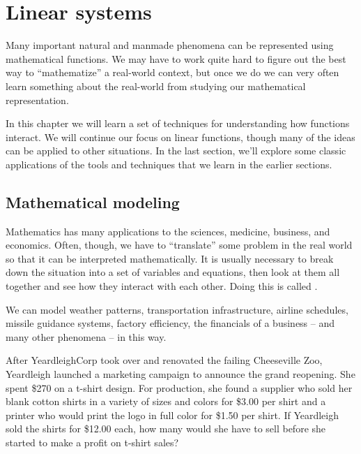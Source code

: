 \chapter{Linear systems}
\label{ch:systems}


Many important natural and manmade phenomena can be represented using mathematical functions. We may have to work quite hard to figure out the best way to ``mathematize'' a real-world context, but once we do we can very often learn something about the real-world from studying our mathematical representation.

In this chapter we will learn a set of techniques for understanding how functions interact. We will continue our focus on linear functions, though many of the ideas can be applied to other situations. In the last section, we'll explore some classic applications of the tools and techniques that we learn in the earlier sections.

\section{Mathematical modeling}
\label{sec:sysintro}

Mathematics has many applications to the sciences, medicine, business, and economics. Often, though, we have to ``translate'' some problem in the real world so that it can be interpreted mathematically. It is usually necessary to break down the situation into a set of variables and equations, then look at them all together and see how they interact with each other. Doing this is called .

We can model weather patterns, transportation infrastructure, airline schedules, missile guidance systems, factory efficiency, the financials of a business -- and many other phenomena -- in this way.

\begin{boxexplore}
After YeardleighCorp took over and renovated the failing Cheeseville Zoo, Yeardleigh launched a marketing campaign to announce the grand reopening. She spent \$270 on a t-shirt design. For production, she found a supplier who sold her blank cotton shirts in a variety of sizes and colors for \$3.00 per shirt and a printer who would print the logo in full color for \$1.50 per shirt. If Yeardleigh sold the shirts for \$12.00 each, how many would she have to sell before she started to make a profit on t-shirt sales?
\end{boxexplore}

